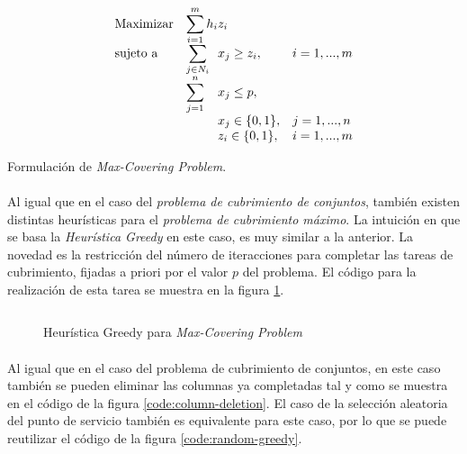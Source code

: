 \documentclass[spanish]{article}
\begin{document}
		\begin{eqfloat}
			\begin{equation}
				\begin{array}{ll@{}ll}
					\text{Maximizar}
						& \displaystyle\sum\limits_{i = 1}^{m} h_{i} & z_{i} 			&							\\
					\text{sujeto a}
						& \displaystyle\sum\limits_{j \in N_i}& x_{j} \geq z_i,		&i=1 ,..., m	\\
						& \displaystyle\sum\limits_{j = 1}^n 	& x_{j} \leq p,  		& 						\\
						&                                     &	x_{j} \in \{0,1\},&j=1 ,..., n 	\\
						&                                     &	z_{i} \in \{0,1\},&i=1 ,..., m  \\
				\end{array}
			\end{equation}
			\caption{Formulación de \emph{Max-Covering Problem}.}
			\label{eq:max_covering}
		\end{eqfloat}

		\paragraph{}
		Al igual que en el caso del \emph{problema de cubrimiento de conjuntos}, también existen distintas heurísticas para el \emph{problema de cubrimiento máximo}. La intuición en que se basa la \emph{Heurística Greedy} en este caso, es muy similar a la anterior. La novedad es la restricción del número de iteracciones para completar las tareas de cubrimiento, fijadas a priori por el valor $p$ del problema. El código para la realización de esta tarea se muestra en la figura \ref{code:greedy-max-covering}.

		\begin{figure}[h]
			\centering
			\inputminted{basic}{./code/max-covering-greedy.mos}
			\caption{Heurística Greedy para \emph{Max-Covering Problem}}
			\label{code:greedy-max-covering}
		\end{figure}

		\paragraph{}
		Al igual que en el caso del problema de cubrimiento de conjuntos, en este caso también se pueden eliminar las columnas ya completadas tal y como se muestra en el código de la figura \ref{code:column-deletion}. El caso de la selección aleatoria del punto de servicio también es equivalente para este caso, por lo que se puede reutilizar el código de la figura \ref{code:random-greedy}.
\end{document}
